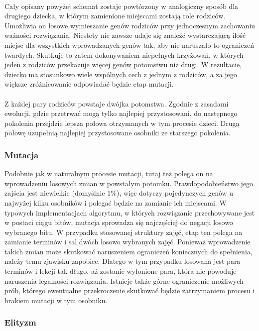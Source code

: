 \paragraph{}Cały opisany powyżej schemat zostaje powtórzony w analogiczny sposób dla drugiego dziecka, w którym zamienione miejscami zostają role rodziców. Umożliwia on losowe wymieszanie genów rodziców przy jednoczesnym zachowaniu ważności rozwiązania. Niestety nie zawsze udaje się znaleźć wystarczającą ilość miejsc dla wszystkich wprowadzanych genów tak, aby nie naruszało to ograniczeń twardych. Skutkuje to zatem dokonywaniem niepełnych krzyżowań, w których jeden z rodziców przekazuje więcej genów potomstwu niż drugi. W rezultacie, dziecko ma stosunkowo wiele wspólnych cech z jednym z rodziców, a za jego większe zróżnicowanie odpowiadać będzie etap mutacji.
\paragraph{}Z każdej pary rodziców powstaje dwójka potomstwa. Zgodnie z zasadami ewolucji, gdzie przetrwać mogą tylko najlepiej przystosowani, do następnego pokolenia przejdzie lepsza połowa otrzymanych w tym procesie dzieci. Drugą połowę uzupełnią najlepiej przystosowane osobniki ze starszego pokolenia.
\subsubsection{Mutacja}
Podobnie jak w naturalnym procesie mutacji, tutaj też polega on na wprowadzeniu losowych zmian w powstałym potomku. Prawdopodobieństwo jego zajścia jest niewielkie (domyślnie 1\%), więc dotyczy pojedynczych genów u najwyżej kilku osobników i polegać będzie na zamianie ich miejscami. W typowych implementacjach algorytmu, w których rozwiązanie przechowywane jest w postaci ciągu bitów, mutacja sprowadza się najczęściej do negacji losowo wybranego bitu. W przypadku stosowanej struktury zajęć, etap ten polega na zamianie terminów i sal dwóch losowo wybranych zajęć. Ponieważ wprowadzenie takich zmian może skutkować naruszeniem ograniczeń koniecznych do spełnienia, należy temu zjawisku zapobiec. Dlatego w tym przypadku losowana jest para terminów i lekcji tak długo, aż zostanie wyłonione para, która nie powoduje naruszenia legalności rozwiązania. Istnieje także górne ograniczenie możliwych prób, którego ewentualne przekroczenie skutkować będzie zatrzymaniem procesu i brakiem mutacji w tym osobniku.
\subsubsection{Elityzm}
